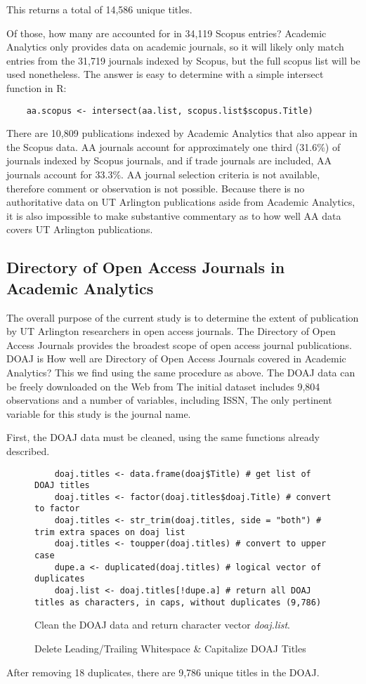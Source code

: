 \documentclass{article}
\begin{document}
This returns a total of 14,586 unique titles.

Of those, how many are accounted for in 34,119 Scopus entries?
Academic Analytics only provides data on academic journals, so it will likely only match entries from the 31,719 journals indexed by Scopus, but the full scopus list will be used nonetheless.
The answer is easy to determine with a simple intersect function in R:
\begin{lstlisting}
	aa.scopus <- intersect(aa.list, scopus.list$scopus.Title)
\end{lstlisting}

There are 10,809 publications indexed by Academic Analytics that also appear in the Scopus data. 
AA journals account for approximately one third (31.6\%) of journals indexed by Scopus journals, and if trade journals are included, AA journals account for 33.3\%.
AA journal selection criteria is not available, therefore comment or observation is not possible.
Because there is no authoritative data on UT Arlington publications aside from Academic Analytics, it is also impossible to make substantive commentary as to how well AA data covers UT Arlington publications.

\subsection{Directory of Open Access Journals in Academic Analytics}
The overall purpose of the current study is to determine the extent of publication by UT Arlington researchers in open access journals.
The Directory of Open Access Journals provides the broadest scope of open access journal publications.
DOAJ is %
How well are Directory of Open Access Journals covered in Academic Analytics?
This we find using the same procedure as above.
The DOAJ data can be freely downloaded on the Web from %
The initial dataset includes 9,804 observations and a number of variables, including ISSN, %
The only pertinent variable for this study is the journal name.

First, the DOAJ data must be cleaned, using the same functions already described.
\begin{figure}[htpb]
	\centering
	\begin{lstlisting}
	doaj.titles <- data.frame(doaj$Title) # get list of DOAJ titles
	doaj.titles <- factor(doaj.titles$doaj.Title) # convert to factor
	doaj.titles <- str_trim(doaj.titles, side = "both") # trim extra spaces on doaj list
	doaj.titles <- toupper(doaj.titles) # convert to upper case
	dupe.a <- duplicated(doaj.titles) # logical vector of duplicates
	doaj.list <- doaj.titles[!dupe.a] # return all DOAJ titles as characters, in caps, without duplicates (9,786)
	\end{lstlisting}
	\footnotesize{
		Clean the DOAJ data and return character vector \textit{doaj.list}.
			}
	\caption{Delete Leading/Trailing Whitespace \& Capitalize DOAJ Titles}
\end{figure}
After removing 18 duplicates, there are 9,786 unique titles in the DOAJ.
\end{document}
